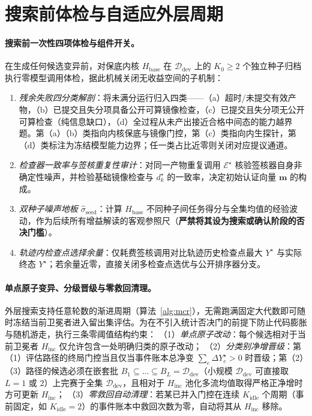 \documentclass[UTF8,a4paper,10.5pt]{ctexart}
\newcommand{\Ddev}{\mathcal{D}_{\mathrm{dev}}}
\begin{document}
\section{搜索前体检与自适应外层周期}
\label{sec:loop}

\paragraph{搜索前一次性四项体检与组件开关。}
在生成任何候选变异前，对保底内核 $H_{\mathrm{base}}$ 在 $\Ddev$ 上的 $K_0\ge 2$ 个独立种子归档执行零模型调用体检，据此机械关闭无收益空间的子机制：
\begin{enumerate}
  \item \emph{残余失败四分类解剖}：将未满分运行归入四类——（a）超时/未提交有效产物，（b）已提交且失分项具备公开可算镜像检查，（c）已提交且失分项无公开可算检查（纯信息缺口），（d）全过程从未产出接近合格中间态的能力越界题。第（a）（b）类指向内核保底与镜像门控，第（c）类指向内生探针，第（d）类标注为冻结模型能力边界；任一类占比近零则关闭对应提议通道。
  \item \emph{检查器一致率与签核重复性审计}：对同一产物重复调用 $\mathcal{E}^\star$ 核验签核器自身非确定性噪声，并检验基础镜像检查与 $d^\star_k$ 的一致率，决定初始认证向量 $\mathbf{m}$ 的构成。
  \item \emph{双种子噪声地板 $\hat{\sigma}_{\mathrm{seed}}$}：计算 $H_{\mathrm{base}}$ 不同种子间任务得分与全集均值的经验波动，作为后续所有增益解读的客观参照尺（\textbf{严禁将其设为搜索或确认阶段的否决门槛}）。
  \item \emph{轨迹内检查点选择余量}：仅耗费签核调用对比轨迹历史检查点最大 $Y^\star$ 与实际终态 $Y^\star$；若余量近零，直接关闭多检查点选优与公开排序器分支。
\end{enumerate}

\paragraph{单点原子变异、分级晋级与零救回清理。}
外层搜索支持任意轮数的渐进周期（算法~\ref{alg:mcr}），无需跑满固定大代数即可随时冻结当前卫冕者进入留出集评估。为在不引入统计否决门的前提下防止代码膨胀与随机游走，执行三条零阈值结构约束：
（1）\emph{单点原子改动}：每个候选相对于当前卫冕者 $H_{\mathrm{inc}}$ 仅允许包含一处明确归类的原子改动；
（2）\emph{分类别净增晋级}：第（1）评估路径的终局门控当且仅当事件账本总净变 $\sum_e \Delta Y^\star_e > 0$ 时晋级；第（2）（3）路径的候选必须在嵌套批 $B_1\subseteq\dots\subseteq B_L=\Ddev$（小规模 $\Ddev$ 可直接取 $L=1$ 或 $2$）上完赛于全集 $\Ddev$，且相对于 $H_{\mathrm{inc}}$ 池化多流均值取得严格正净增时方可更新 $H_{\mathrm{inc}}$；
（3）\emph{零救回自动清理}：若某已并入门控在连续 $K_{\mathrm{idle}}$ 个周期（事前固定，如 $K_{\mathrm{idle}}=2$）的事件账本中救回次数为零，自动将其从 $H_{\mathrm{inc}}$ 移除。
\end{document}
